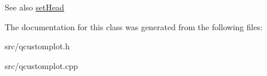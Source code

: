 \begin{DoxySeeAlso}{See also}
\hyperlink{classQCPItemCurve_a08a30d9cdd63995deea3d9e20430676f}{set\+Head} 
\end{DoxySeeAlso}


The documentation for this class was generated from the following files\+:\begin{DoxyCompactItemize}
\item 
src/qcustomplot.\+h\item 
src/qcustomplot.\+cpp\end{DoxyCompactItemize}
